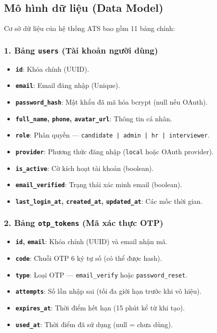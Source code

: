 \subsection{Mô hình dữ liệu (Data Model)}
Cơ sở dữ liệu của hệ thống ATS bao gồm 11 bảng chính:

\subsubsection*{1. Bảng \texttt{users} (Tài khoản người dùng)}
\begin{itemize}
    \item \textbf{\texttt{id}}: Khóa chính (UUID).
    \item \textbf{\texttt{email}}: Email đăng nhập (Unique).
    \item \textbf{\texttt{password\_hash}}: Mật khẩu đã mã hóa bcrypt (null nếu OAuth).
    \item \textbf{\texttt{full\_name}, \texttt{phone}, \texttt{avatar\_url}}: Thông tin cá nhân.
    \item \textbf{\texttt{role}}: Phân quyền --- \texttt{candidate | admin | hr | interviewer}.
    \item \textbf{\texttt{provider}}: Phương thức đăng nhập (\texttt{local} hoặc OAuth provider).
    \item \textbf{\texttt{is\_active}}: Cờ kích hoạt tài khoản (boolean).
    \item \textbf{\texttt{email\_verified}}: Trạng thái xác minh email (boolean).
    \item \textbf{\texttt{last\_login\_at}, \texttt{created\_at}, \texttt{updated\_at}}: Các mốc thời gian.
\end{itemize}

\subsubsection*{2. Bảng \texttt{otp\_tokens} (Mã xác thực OTP)}
\begin{itemize}
    \item \textbf{\texttt{id}, \texttt{email}}: Khóa chính (UUID) và email nhận mã.
    \item \textbf{\texttt{code}}: Chuỗi OTP 6 ký tự số (có thể được hash).
    \item \textbf{\texttt{type}}: Loại OTP --- \texttt{email\_verify} hoặc \texttt{password\_reset}.
    \item \textbf{\texttt{attempts}}: Số lần nhập sai (tối đa giới hạn trước khi vô hiệu).
    \item \textbf{\texttt{expires\_at}}: Thời điểm hết hạn (15 phút kể từ khi tạo).
    \item \textbf{\texttt{used\_at}}: Thời điểm đã sử dụng (null = chưa dùng).
\end{itemize}

